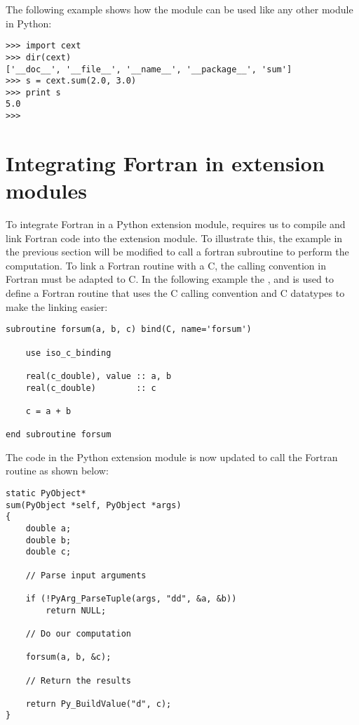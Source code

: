 The following example shows how the module can be used like any other module in Python:

\pymode

\begin{lstlisting}
>>> import cext
>>> dir(cext)
['__doc__', '__file__', '__name__', '__package__', 'sum']
>>> s = cext.sum(2.0, 3.0)
>>> print s
5.0
>>>
\end{lstlisting}

\section{Integrating Fortran in extension modules}

To integrate Fortran in a Python extension module, requires us to compile and link Fortran code into the extension module. To illustrate this, the example in the previous section will be modified to call a fortran subroutine to perform the computation. To link a Fortran routine with a C, the calling convention in Fortran must be adapted to C. In the following example the ,  and  is used to define a Fortran routine that uses the C calling convention and C datatypes to make the linking easier:

\fmode

\begin{lstlisting}
subroutine forsum(a, b, c) bind(C, name='forsum')

	use iso_c_binding

	real(c_double), value :: a, b
	real(c_double)        :: c

	c = a + b

end subroutine forsum
\end{lstlisting}

The code in the Python extension module is now updated to call the Fortran routine as shown below:

\cmode

\begin{lstlisting}
static PyObject* 
sum(PyObject *self, PyObject *args)
{
    double a;
    double b;
    double c;

    // Parse input arguments

    if (!PyArg_ParseTuple(args, "dd", &a, &b))
        return NULL;

    // Do our computation

    forsum(a, b, &c);

    // Return the results

    return Py_BuildValue("d", c);
}
\end{lstlisting}

